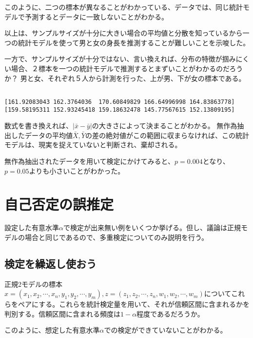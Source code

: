 \fi
{}
このように、二つの標本が異なることがわかっている、データでは、同じ統計モデルで予測するとデータに一致しないことがわかる。
\fi

以上は、サンプルサイズが十分に大きい場合の平均値と分散を知っているから一つの統計モデルを使って男と女の身長を推測することが難しいことを示唆した。


一方で、サンプルサイズが十分ではない、言い換えれば、分布の特徴が掴みにくい場合、２標本を一つの統計モデルで推測するとまずいことがわかるのだろうか？
男と女、それぞれ５人から計測を行った、上が男、下が女の標本である。
\begin{lstlisting}

[161.92083043 162.3764036  170.60849829 166.64996998 164.83863778]
[159.58195311 152.93245418 159.18632478 145.77567615 152.13809195]
\end{lstlisting}



数式を書き換えれば、$|\bar{x}-\bar{y}|$の大きさによって決まることがわかる。
無作為抽出したデータの平均値$\bar{X},\bar{Y}$の差の絶対値がこの範囲に収まらなければ、この統計モデルは、現実を捉えていないと判断され、棄却される。

無作為抽出されたデータを用いて検定にかけてみると、$p=0.004$となり、$p=0.05$よりも小さいことがわかった。
\fi


\section{自己否定の誤推定}
設定した有意水準$\alpha$で検定が出来無い例をいくつか挙げる。但し、議論は正規モデルの場合と同じであるので、多重検定についてのみ説明を行う。
\subsection{検定を繰返し使おう}
正規2モデルの標本$x=(x_1,x_2,\cdots,x_n,y_1,y_2,\cdots,y_m),z=(z_1,z_2,\cdots,z_n,w_1,w_2,\cdots,w_m)$についてこれらをペアにする。これらを統計検定量を用いて、それが信頼区間に含まれるかを判別する。信頼区間に含まれる頻度は$1-\alpha$程度であるだろうか。


このように、想定した有意水準$\alpha$での検定ができていないことがわかる。
